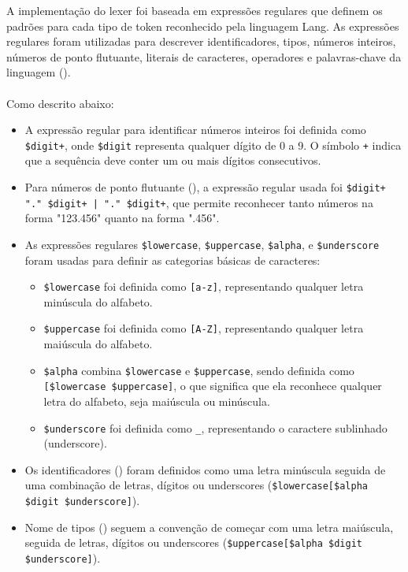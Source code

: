 \documentclass{article}
\begin{document}
A implementação do lexer foi baseada em expressões regulares que definem os padrões para cada tipo de token reconhecido pela linguagem Lang. As expressões regulares foram utilizadas para descrever identificadores, tipos, números inteiros, números de ponto flutuante, literais de caracteres, operadores e palavras-chave da linguagem (\cite{aleardo2024}).
\\\\
Como descrito abaixo:
\begin{itemize}
    \item A expressão regular para identificar números inteiros \texttt{\@integer} foi definida como \texttt{\$digit+}, onde \texttt{\$digit} representa qualquer dígito de 0 a 9. O símbolo \texttt{+} indica que a sequência deve conter um ou mais dígitos consecutivos.
    \item Para números de ponto flutuante (\texttt{\@float}), a expressão regular usada foi \texttt{\$digit+ "." \$digit+ | "." \$digit+}, que permite reconhecer tanto números na forma "123.456" quanto na forma ".456".
    \item As expressões regulares \texttt{\$lowercase}, \texttt{\$uppercase}, \texttt{\$alpha}, e \texttt{\$underscore} foram usadas para definir as categorias básicas de caracteres:
    \begin{itemize}
        \item \texttt{\$lowercase} foi definida como \texttt{[a-z]}, representando qualquer letra minúscula do alfabeto.
        \item \texttt{\$uppercase} foi definida como \texttt{[A-Z]}, representando qualquer letra maiúscula do alfabeto.
        \item \texttt{\$alpha} combina \texttt{\$lowercase} e \texttt{\$uppercase}, sendo definida como \texttt{[\$lowercase \$uppercase]}, o que significa que ela reconhece qualquer letra do alfabeto, seja maiúscula ou minúscula.
        \item \texttt{\$underscore} foi definida como \texttt{\_}, representando o caractere sublinhado (underscore).
    \end{itemize}
    \item Os identificadores (\texttt{\@identifier}) foram definidos como uma letra minúscula seguida de uma combinação de letras, dígitos ou underscores (\texttt{\$lowercase[\$alpha \$digit \$underscore]}).
    \item Nome de tipos (\texttt{\@typename}) seguem a convenção de começar com uma letra maiúscula, seguida de letras, dígitos ou underscores (\texttt{\$uppercase[\$alpha \$digit \$underscore]}).

\end{itemize}
\end{document}

